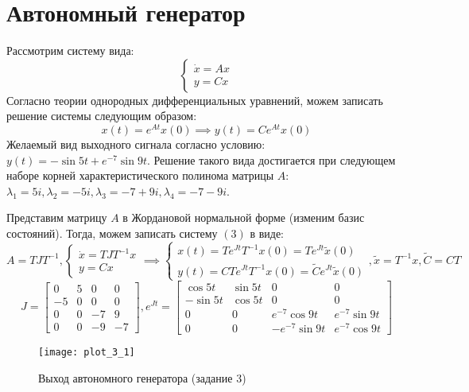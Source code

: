 \section{Автономный генератор}
Рассмотрим систему вида:
\begin{equation}
    \begin{cases}
        \dot x = A x \\
        y = C x
    \end{cases}
\end{equation}
Согласно теории однородных дифференциальных уравнений, можем записать решение системы следующим образом:
\begin{equation}
    x(t) = e^{At}x(0) \implies y(t) = C e^{At}x(0)
\end{equation}
Желаемый вид выходного сигнала согласно условию: $y(t) = -\sin{5t} + e^{-7}\sin{9t}$. Решение такого вида
достигается при следующем наборе корней характеристического полинома матрицы $A$:\\ $\lambda_1 = 5i, \lambda_2 = -5i
,\lambda_3 = -7 + 9i,\lambda_4 = -7 - 9i$.

Представим матрицу $A$ в Жордановой нормальной форме (изменим базис состояний). Тогда, можем записать систему $(3)$ в виде:
\begin{equation}
    A = TJT^{-1},
    \begin{cases}
        \dot x = TJT^{-1}x \\
        y = C x
    \end{cases}
    \implies 
    \begin{cases}
        x(t) = Te^{Jt}T^{-1}x(0) = Te^{Jt}\widetilde{x}(0) \\
        y(t) = C Te^{Jt}T^{-1}x(0) = \widetilde{C}e^{Jt}\widetilde{x}(0)
    \end{cases},
    \widetilde{x} = T^{-1}x, \widetilde{C} = CT
\end{equation}
\begin{equation*}
    J = \begin{bmatrix}
        0 & 5 & 0 & 0   \\
        -5 & 0 & 0 & 0  \\
        0 & 0 & -7 & 9 \\
        0 & 0 & -9 & -7
        \end{bmatrix},
    e^{Jt} = \begin{bmatrix}
        \cos{5t} & \sin{5t} & 0 & 0   \\
        -\sin{5t} & \cos{5t} & 0 & 0  \\
        0 & 0 & e^{-7}\cos{9t} & e^{-7}\sin{9t} \\
        0 & 0 & -e^{-7}\sin{9t} & e^{-7}\cos{9t}
        \end{bmatrix}
\end{equation*}
\begin{figure}[h]
    \centering
    \texttt{[image: plot\_3\_1]}
    \caption{\label{fig:The-caption-1}Выход автономного генератора (задание 3)}
\end{figure}

